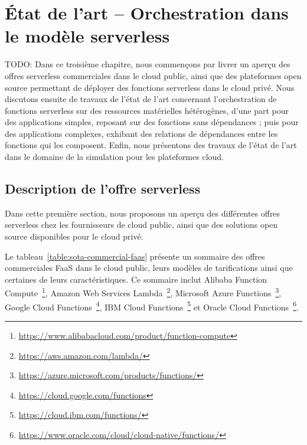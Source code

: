 \chapter{État de l'art -- Orchestration dans le modèle serverless}
\label{chapter:sota}

TODO: Dans ce troisième chapitre, nous commençons par livrer un aperçu des offres serverless commerciales dans le cloud public, ainsi que des plateformes open source permettant de déployer des fonctions serverless dans le cloud privé.
Nous discutons ensuite de travaux de l'état de l'art concernant l'orchestration de fonctions serverless sur des ressources matérielles hétérogènes, d'une part pour des applications simples, reposant sur des fonctions sans dépendances ; puis pour des applications complexes, exhibant des relations de dépendances entre les fonctions qui les composent. Enfin, nous présentons des travaux de l'état de l'art dans le domaine de la simulation pour les plateformes cloud.

\section{Description de l'offre serverless}
\label{section:sota-offerings}

Dans cette première section, nous proposons un aperçu des différentes offres serverless chez les fournisseurs de cloud public, ainsi que des solutions open source disponibles pour le cloud privé.

Le tableau~\ref{table:sota-commercial-faas} présente un sommaire des offres commerciales FaaS dans le cloud public, leurs modèles de tarifications ainsi que certaines de leurs caractéristiques. Ce sommaire inclut Alibaba Function Compute~\footnote{\label{footnote:alibaba-function}\href{https://www.alibabacloud.com/product/function-compute}{https://www.alibabacloud.com/product/function-compute}}, Amazon Web Services Lambda~\footnote{\label{footnote:aws-lambda}\href{https://aws.amazon.com/lambda/}{https://aws.amazon.com/lambda/}}, Microsoft Azure Functions~\footnote{\label{footnote:azure-functions}\href{https://azure.microsoft.com/products/functions/}{https://azure.microsoft.com/products/functions/}}, Google Cloud Functions~\footnote{\label{footnote:google-functions}\href{https://cloud.google.com/functions}{https://cloud.google.com/functions}}, IBM Cloud Functions~\footnote{\label{footnote:ibm-functions}\href{https://cloud.ibm.com/functions/}{https://cloud.ibm.com/functions/}} et Oracle Cloud Functions~\footnote{\label{footnote:oracle-functions}\href{https://www.oracle.com/cloud/cloud-native/functions/}{https://www.oracle.com/cloud/cloud-native/functions/}}.


